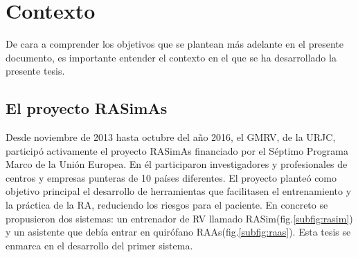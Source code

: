 

\section{Contexto}

De cara a comprender los objetivos que se plantean más adelante en el presente documento, es importante entender el contexto en el que se ha desarrollado la presente tesis. 


\subsection{El proyecto RASimAs}
\label{intro:rasimas}

Desde noviembre de 2013 hasta octubre del año 2016, el \ac{GMRV}, de la \ac{URJC}, participó activamente el proyecto \ac{RASimAs}\cite{rasimasweb} financiado por el Séptimo Programa Marco de la Unión Europea. En él participaron investigadores y profesionales de centros y empresas punteras de 10 países diferentes. El proyecto planteó como objetivo principal el desarrollo de herramientas que facilitasen el entrenamiento y la práctica de la \ac{RA}, reduciendo los riesgos para el paciente. En concreto se propusieron dos sistemas: un entrenador de \ac{RV} llamado \ac{RASim}(fig.\ref{subfig:rasim}) y un asistente que debía entrar en quirófano \ac{RAAs}(fig.\ref{subfig:raas}). Esta tesis se enmarca en el desarrollo del primer sistema.

